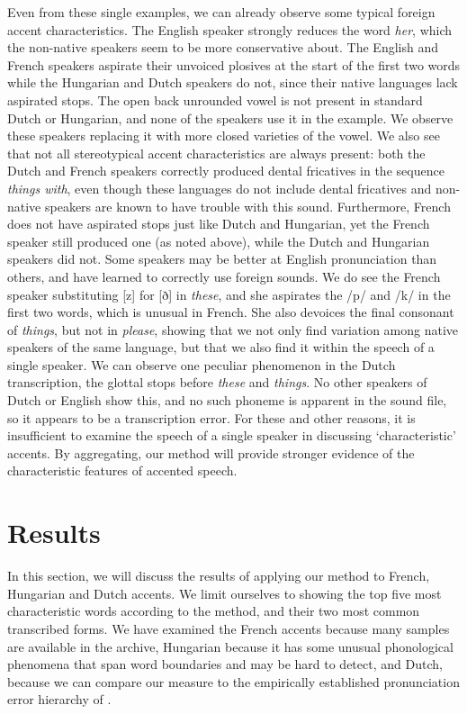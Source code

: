 \documentclass[output=paper]{LSP/langsci}
\begin{document}
Even from these single examples, we can already observe some typical foreign accent characteristics. The English speaker strongly reduces the word \textit{her}, which the non-native speakers seem to be more conservative about. The English and French speakers aspirate their unvoiced plosives at the start of the first two words 
while the Hungarian and Dutch speakers do not, since their native languages lack aspirated stops. The open back unrounded vowel 
is not present in standard Dutch or Hungarian, and none of the speakers use it in the example. We observe these speakers replacing it with more closed varieties of the vowel. We also see that not all stereotypical accent characteristics are always present: both the Dutch and French speakers correctly produced dental fricatives in the sequence \textit{things with}, even though these languages do not include dental fricatives and non-native speakers are known to have trouble with this sound. Furthermore, French does not have aspirated stops just like Dutch and Hungarian, yet the French speaker still produced one (as noted above), while the Dutch and Hungarian speakers did not. Some speakers may be better at English pronunciation than others, and have learned to correctly use foreign sounds. We do see the French speaker substituting [z] for [ð] in \textit{these}, and she aspirates the /p/ and /k/ in the first two words, which is unusual in French. She also devoices the final consonant of \textit{things}, but not in \textit{please}, showing that we not only find variation among native speakers of the same language, but that we also find it within the speech of a single speaker. We can observe one peculiar phenomenon in the Dutch transcription, the glottal stops before \textit{these} and \textit{things}. No other speakers of Dutch or English show this, and no such phoneme is apparent in the sound file, so it appears to be a transcription error. For these and other reasons, it is insufficient to examine the speech of a single speaker in discussing `characteristic' accents. By aggregating, our method will provide stronger evidence of the characteristic features of accented speech.

\section{Results}
\label{s:results}

In this section, we will discuss the results of applying our method to French, Hungarian and Dutch accents. We limit ourselves to showing the top five most characteristic words according to the method, and their two most common transcribed forms. We have examined the French accents because many samples are available in the archive, Hungarian because it has some unusual phonological phenomena that span word boundaries and may be hard to detect, and Dutch, because we can compare our measure to the empirically established pronunciation error hierarchy of \citet{van_den_doel_evaluation_2006}.
\end{document}

